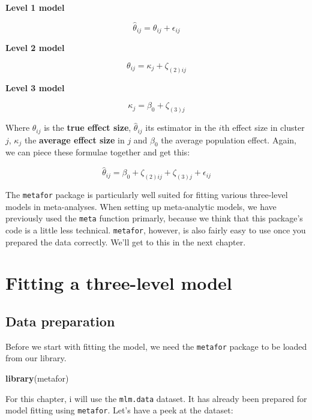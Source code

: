 \documentclass[]{book}
\newenvironment{Shaded}{\begin{snugshade}}{\end{snugshade}}
\newcommand{\KeywordTok}[1]{\textcolor[rgb]{0.13,0.29,0.53}{\textbf{#1}}}
\newcommand{\NormalTok}[1]{#1}
\begin{document}
\begin{rmdinfo}
\textbf{Level 1 model}

\[\hat\theta_{ij} = \theta_{ij} + \epsilon_{ij}\]

\textbf{Level 2 model}

\[\theta_{ij} = \kappa_{j} + \zeta_{(2)ij}\]

\textbf{Level 3 model}

\[\kappa_{j} = \beta_{0} + \zeta_{(3)j}\]

Where \(\theta_{ij}\) is the \textbf{true effect size},
\(\hat\theta_{ij}\) its estimator in the \(i\)th effect size in cluster
\(j\), \(\kappa_{j}\) the \textbf{average effect size} in \(j\) and
\(\beta_0\) the average population effect. Again, we can piece these
formulae together and get this:

\[\hat\theta_{ij} = \beta_{0} + \zeta_{(2)ij} + \zeta_{(3)j} + \epsilon_{ij}\]
\end{rmdinfo}

The \texttt{metafor} package is particularly well suited for fitting various three-level models in meta-analyses. When setting up meta-analytic models, we have previously used the \texttt{meta} function primarly, because we think that this package's code is a little less technical. \texttt{metafor}, however, is also fairly easy to use once you prepared the data correctly. We'll get to this in the next chapter.

\hypertarget{fitting-a-three-level-model}{%
\section{Fitting a three-level model}\label{fitting-a-three-level-model}}

\hypertarget{data-preparation}{%
\subsection{Data preparation}\label{data-preparation}}

Before we start with fitting the model, we need the \texttt{metafor} package to be loaded from our library.

\begin{Shaded}
\begin{Highlighting}[]
\KeywordTok{library}\NormalTok{(metafor)}
\end{Highlighting}
\end{Shaded}

For this chapter, i will use the \texttt{mlm.data} dataset. It has already been prepared for model fitting using \texttt{metafor}. Let's have a peek at the dataset:
\end{document}
